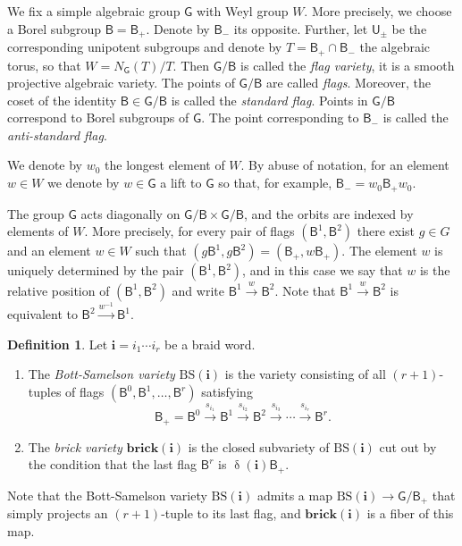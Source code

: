 \documentclass[a4paper, 11pt]{amsart}
\newcommand{\brick}{\mathbf{brick}}
\newcommand{\borel}{\mathsf{B}}
\newcommand{\unipotent}{\mathsf{U}}
\newcommand{\flag}[1]{\mathsf{B}^{#1}}
\newcommand{\rel}[1]{\xrightarrow{#1}}
\newcommand{\word}[1]{\mathbf{#1}}
\DeclareMathOperator{\dem}{\delta}
\newcommand{\group}{\mathsf{G}}
\newcommand{\wo}{w_{0}}
\newcommand{\BS}{\mathrm{BS}}
\theoremstyle{definition}
\newtheorem{definition}[theorem]{Definition}
\begin{document}
We fix a simple algebraic group $\group$ with Weyl group $W$. More precisely, we 
choose a Borel subgroup $\borel=\borel_+$. Denote by $\borel_-$ its opposite. Further, let $\unipotent_{\pm}$ be the corresponding unipotent subgroups and denote by $T=\borel_+\cap \borel_-$ the algebraic torus, so that $W = N_{\group}(T)/T$. 
Then $\group/\borel$ is called the \emph{flag variety}, it is a smooth projective algebraic variety. The points of $\group/\borel$ are called \emph{flags}. Moreover, the coset of the identity $\borel\in \group/\borel$ is called the \emph{standard flag}.
Points in $\group/\borel$ correspond to Borel subgroups of $\group$. The point corresponding to $\borel_-$ is called the \emph{anti-standard flag}.

\medskip
We denote by $\wo$ the longest element of $W$. By abuse of notation, for an element $w \in W$ we denote by $w \in \group$ a lift to $\group$ so that, for example, $\borel_- = \wo\borel_+\wo$.

The group $\group$ acts diagonally on $\group/\borel \times \group/\borel$, and the orbits are indexed by elements of $W$. More precisely, for every pair of flags $(\flag{1}, \flag{2})$ there exist $g \in G$ and an element $w \in W$ such that $(g\flag{1}, g\flag{2}) = (\borel_{+}, w\borel_{+})$. The element $w$ is uniquely determined by the pair $(\flag{1}, \flag{2})$, and in this case we say that $w$ is the relative position of $(\flag{1}, \flag{2})$ and write $\flag{1} \rel{w} \flag{2}$. Note that $\flag{1} \rel{w} \flag{2}$ is equivalent to $\flag{2} \rel{w^{-1}} \flag{1}$. 

\begin{definition}
    Let $\word{i} = i_1\cdots i_r$ be a braid word. 
    \begin{enumerate}
        \item The \emph{Bott-Samelson variety}  $\BS(\word{i})$ is the variety consisting of all $(r+1)$-tuples of flags $(\flag{0}, \flag{1}, \dots, \flag{r})$ satisfying
        \[
        \borel_{+} = \flag{0} \rel{s_{i_1}} \flag{1} \rel{s_{i_2}} \flag{2} \rel{s_{i_3}} \cdots \rel{s_{i_r}} \flag{r}.
        \]
    \item The \emph{brick variety} $\brick(\word{i})$ is the closed subvariety of $\BS(\word{i})$ cut out by the condition that the last flag $\flag{r}$ is $\dem(\word{i})\borel_{+}$.
    \end{enumerate}

    Note that the Bott-Samelson variety $\BS(\word{i})$ admits a map $\BS({\word{i}}) \to \group/\borel_{+}$ that simply projects an $(r+1)$-tuple to its last flag, and $\brick(\word{i})$ is a fiber of this map. 
\end{definition}
\end{document}
